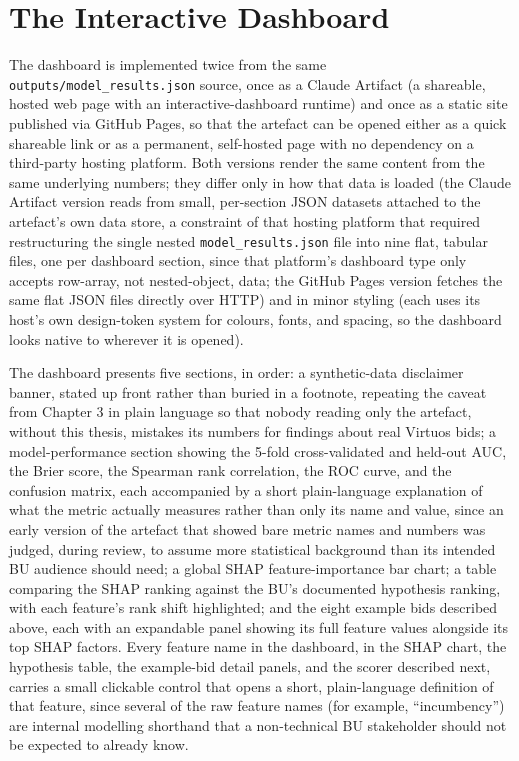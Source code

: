 \hypertarget{the-interactive-dashboard}{%
\section{The Interactive Dashboard}\label{the-interactive-dashboard}}

The dashboard is implemented twice from the same
\texttt{outputs/model\_results.json} source, once as a Claude Artifact
(a shareable, hosted web page with an interactive-dashboard runtime) and
once as a static site published via GitHub Pages, so that the artefact
can be opened either as a quick shareable link or as a permanent,
self-hosted page with no dependency on a third-party hosting platform.
Both versions render the same content from the same underlying numbers;
they differ only in how that data is loaded (the Claude Artifact version
reads from small, per-section JSON datasets attached to the artefact's
own data store, a constraint of that hosting platform that required
restructuring the single nested \texttt{model\_results.json} file into
nine flat, tabular files, one per dashboard section, since that
platform's dashboard type only accepts row-array, not nested-object,
data; the GitHub Pages version fetches the same flat JSON files directly
over HTTP) and in minor styling (each uses its host's own design-token
system for colours, fonts, and spacing, so the dashboard looks native to
wherever it is opened).

The dashboard presents five sections, in order: a synthetic-data
disclaimer banner, stated up front rather than buried in a footnote,
repeating the caveat from Chapter 3 in plain language so that nobody
reading only the artefact, without this thesis, mistakes its numbers for
findings about real Virtuos bids; a model-performance section showing
the 5-fold cross-validated and held-out AUC, the Brier score, the
Spearman rank correlation, the ROC curve, and the confusion matrix, each
accompanied by a short plain-language explanation of what the metric
actually measures rather than only its name and value, since an early
version of the artefact that showed bare metric names and numbers was
judged, during review, to assume more statistical background than its
intended BU audience should need; a global SHAP feature-importance bar
chart; a table comparing the SHAP ranking against the BU's documented
hypothesis ranking, with each feature's rank shift highlighted; and the
eight example bids described above, each with an expandable panel
showing its full feature values alongside its top SHAP factors. Every
feature name in the dashboard, in the SHAP chart, the hypothesis table,
the example-bid detail panels, and the scorer described next, carries a
small clickable control that opens a short, plain-language definition of
that feature, since several of the raw feature names (for example,
``incumbency'') are internal modelling shorthand that a non-technical BU
stakeholder should not be expected to already know.

